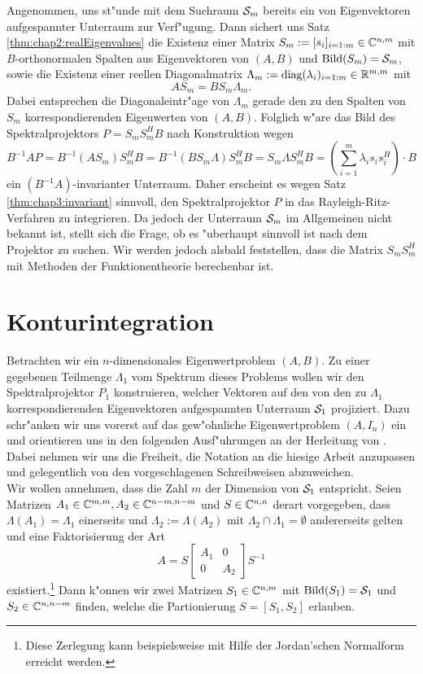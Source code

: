 Angenommen, uns st"unde mit dem Suchraum $\S_m$ bereits ein von Eigenvektoren
aufgespannter Unterraum zur Verf"ugung. Dann sichert uns Satz \ref{thm:chap2:realEigenvalues} die Existenz einer Matrix $S_m := [s_i]_{i=1:m}\in\C^{n,m}$ mit
$B$-orthonormalen Spalten aus Eigenvektoren von $(A,B)$ und $\Bild(S_m)=\S_m$, sowie die Existenz einer reellen Diagonalmatrix
$\Lambda_m := \text{diag}(\lambda_i)_{i=1:m}\in\R^{m,m}$ mit
\[
AS_m = BS_m\Lambda_m.
\]
Dabei entsprechen die Diagonaleintr"age von $\Lambda_m$ gerade den zu den Spalten
von $S_m$ korrespondierenden Eigenwerten von $(A,B)$. Folglich w"are das Bild
des Spektralprojektors $P=S_m S_m^H B$ nach Konstruktion wegen
\[
B^{-1}AP = B^{-1}(AS_m)S_m^H B = B^{-1}(BS_m \Lambda)S_m^H B
= S_m\Lambda S_m^H B = \left(\sum_{i=1}^m \lambda_i s_i s_i^H\right)\cdot B
\]
ein $(B^{-1}A)$-invarianter Unterraum. Daher erscheint es
wegen Satz \ref{thm:chap3:invariant} sinnvoll, den Spektralprojektor $P$ in das
Rayleigh-Ritz-Verfahren zu integrieren.
Da jedoch der Unterraum $\S_m$ im Allgemeinen nicht bekannt ist, stellt sich die Frage, ob es
"uberhaupt sinnvoll ist nach dem Projektor zu suchen.
Wir werden jedoch alsbald feststellen, dass %
die Matrix $S_m S_m^H$ mit Methoden der Funktionentheorie berechenbar ist.

\section{Konturintegration}\label{sec:chap3:konturintegration}

Betrachten wir ein $n$-dimensionales Eigenwertproblem $(A,B)$. Zu einer gegebenen Teilmenge $\Lambda_1$ vom Spektrum dieses Problems wollen wir
den Spektralprojektor $P_1$ konstruieren, welcher Vektoren auf den von den zu $\Lambda_1$ korrespondierenden Eigenvektoren aufgespannten Unterraum $\S_1$ projiziert.
Dazu schr"anken wir uns vorerst auf das gew"ohnliche Eigenwertproblem $(A,I_n)$ ein und orientieren
uns in
den folgenden Ausf"uhrungen an der Herleitung von \cite[Abschnitt 4.9]{liesen}.
Dabei nehmen wir uns die Freiheit, die Notation an die hiesige Arbeit anzupassen und gelegentlich von den vorgeschlagenen Schreibweisen abzuweichen.\\

Wir wollen annehmen, dass die Zahl $m$ der Dimension von $\S_1$ entspricht. Seien Matrizen $A_1\in\C^{m,m},
A_2\in\C^{n-m,n-m}$ und $S\in\Cnn$ derart vorgegeben, dass  $\Lambda(A_1) = \Lambda_1$ einerseits und $\Lambda_2 := \Lambda(A_2)$ mit $\Lambda_2 \cap \Lambda_1 = \emptyset$ andererseits gelten und eine Faktorisierung der Art
\begin{equation}\label{eq:chap3:factorization}
A = S\begin{bmatrix} A_1 & 0 \\ 0 & A_2 \end{bmatrix} S^{-1}
\end{equation}
existiert.\footnote{Diese Zerlegung kann beispielsweise mit Hilfe der Jordan'schen Normalform erreicht werden.}
Dann k"onnen wir zwei Matrizen $S_1 \in \C^{n,m}$ mit $\Bild(S_1) = \S_1$ und
$S_2 \in \C^{n,n-m}$ finden, welche die Partionierung $S=[S_1, S_2]$ erlauben.

